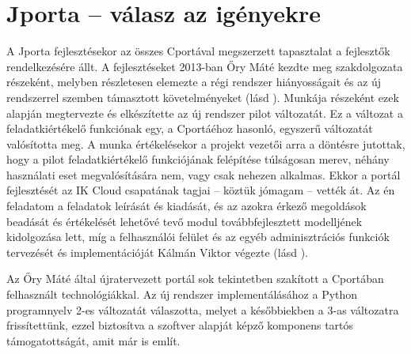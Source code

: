 \section{Jporta -- válasz az igényekre}
A Jporta fejlesztésekor az összes Cportával megszerzett tapasztalat a fejlesztők rendelkezésére állt.
A fejlesztéseket 2013-ban Őry Máté kezdte meg szakdolgozata részeként, melyben részletesen elemezte a régi rendszer hiányosságait és az új rendszerrel szemben támasztott követelményeket (lásd \cite{Ory13}).
Munkája részeként ezek alapján megtervezte és elkészítette az új rendszer pilot változatát.  
Ez a változat a feladatkiértékelő funkciónak egy, a Cportáéhoz hasonló, egyszerű változatát valósította meg.
A munka értékelésekor a projekt vezetői arra a döntésre jutottak, hogy a pilot feladatkiértékelő funkciójának felépítése túlságosan merev, néhány használati eset megvalósítására nem, vagy csak nehezen alkalmas. 
Ekkor a portál fejlesztését az IK Cloud csapatának tagjai -- köztük jómagam -- vették át.
Az én feladatom a feladatok leírását és kiadását, és az azokra érkező megoldások beadását és értékelését lehetővé tevő modul továbbfejlesztett modelljének kidolgozása lett, míg a felhasználói felület és az egyéb adminisztrációs funkciók tervezését és implementációját Kálmán Viktor végezte (lásd \cite{Kalman14}).

Az Őry Máté által újratervezett portál sok tekintetben szakított a Cportában felhasznált technológiákkal.
Az új rendszer implementálásához a Python programnyelv 2-es változatát válaszotta, melyet a későbbiekben a 3-as változatra frissítettünk, ezzel biztosítva a szoftver alapját képző komponens tartós támogatottságát, amit már \cite{Kalman14} is említ.


